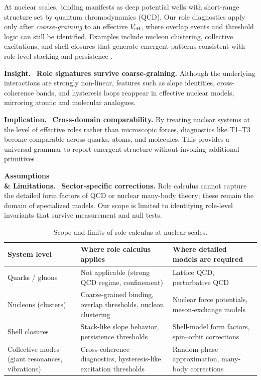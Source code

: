 \documentclass[12pt,a4paper,oneside]{scrreprt}
\newenvironment{insight}{\par\vspace{0.5em}\noindent\textbf{Insight.}\ }{\par\vspace{0.5em}}
\newenvironment{implication}{\par\vspace{0.5em}\noindent\textbf{Implication.}\ }{\par\vspace{0.5em}}
\newenvironment{limitation}{\par\vspace{0.5em}\noindent\textbf{Assumptions \\ \& Limitations.}\ }{\par\vspace{0.5em}}
\begin{document}
At nuclear scales, binding manifests as deep potential wells with 
short-range structure set by quantum chromodynamics (QCD). 
Our role diagnostics apply only after \emph{coarse-graining} to 
an effective $V_{\rm eff}$, where overlap events and threshold 
logic can still be identified. 
Examples include nucleon clustering, collective excitations, 
and shell closures that generate emergent patterns consistent 
with role-level stacking and persistence \citep{Ring1980Nuclear}. 

\begin{insight}
\textbf{Role signatures survive coarse-graining.} 
Although the underlying interactions are strongly non-linear, 
features such as slope identities, cross-coherence bands, 
and hysteresis loops reappear in effective nuclear models, 
mirroring atomic and molecular analogues. 
\end{insight}

\begin{implication}
\textbf{Cross-domain comparability.} 
By treating nuclear systems at the level of effective roles 
rather than microscopic forces, diagnostics like T1--T3 
become comparable across quarks, atoms, and molecules. 
This provides a universal grammar to report emergent 
structure without invoking additional primitives 
\citep{BohrMottelson1998NuclearStructure}.
\end{implication}

\begin{limitation}
\textbf{Sector-specific corrections.} 
Role calculus cannot capture the detailed form factors of 
QCD or nuclear many-body theory; these remain the domain of 
specialized models. 
Our scope is limited to identifying role-level invariants that 
survive measurement and null tests. 
\end{limitation}

\begin{table}[h]
\centering
\caption{Scope and limits of role calculus at nuclear scales.}
\begin{tabular}{p{3.5cm} p{5cm} p{5cm}}
\toprule
\textbf{System level} & \textbf{Where role calculus applies} & \textbf{Where detailed models are required} \\
\midrule
Quarks / gluons & Not applicable (strong QCD regime, confinement) & Lattice QCD, perturbative QCD \\
\addlinespace
Nucleons (clusters) & Coarse-grained binding, overlap thresholds, nucleon clustering & Nuclear force potentials, meson-exchange models \\
\addlinespace
Shell closures & Stack-like slope behavior, persistence thresholds & Shell-model form factors, spin–orbit corrections \\
\addlinespace
Collective modes (giant resonances, vibrations) & Cross-coherence diagnostics, hysteresis-like excitation thresholds & Random-phase approximation, many-body corrections \\
\bottomrule
\end{tabular}
\end{table}
\end{document}

